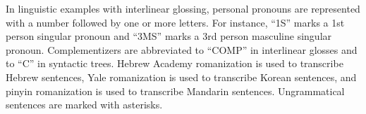 \documentclass[12pt]{report}
\begin{document}
\noindent In linguistic examples with interlinear glossing, personal pronouns are represented with a number followed by one or more letters. For instance, ``1S'' marks a 1st person singular pronoun and ``3MS'' marks a 3rd person masculine singular pronoun. Complementizers are abbreviated to ``COMP'' in interlinear glosses and to ``C'' in syntactic trees. Hebrew Academy romanization is used to transcribe Hebrew sentences, Yale romanization is used to transcribe Korean sentences, and pinyin romanization is used to transcribe Mandarin sentences. Ungrammatical sentences are marked with asterisks.

\newpage


\renewcommand\thepage{\romannumeral\numexpr\value{page}\relax}
\setcounter{page}{1}
\setlength{\parskip}{0pt}





\setlength{\parindent}{0in}

\appendix




\renewcommand{\bibname}{References}
\printbibliography
{}
\end{document}
